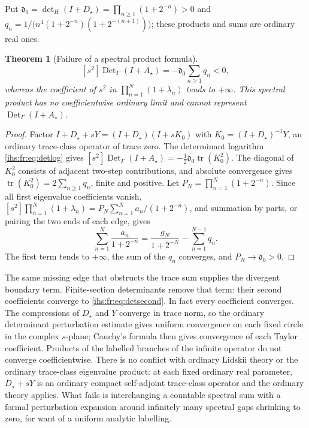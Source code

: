 \documentclass[11pt,a4paper]{article}
\numberwithin{equation}{section}
\newtheorem{theorem}{Theorem}[section]
\theoremstyle{definition}
\theoremstyle{remark}
\newcommand{\Tr}{\operatorname{tr}}
\newcommand{\Det}{\operatorname{Det}_\Gamma}
\begin{document}
Put $\mathfrak d_0=\det_H(I+D_\star)=\prod_{n\ge1}(1+2^{-n})>0$ and
$q_n=1/\bigl(n^4(1+2^{-n})(1+2^{-(n+1)})\bigr)$; these products and sums are
ordinary real ones.

\begin{theorem}[Failure of a spectral product formula]\label{ihs:fr:thm:noproduct}
\begin{equation}\label{ihs:fr:eq:detsecond}
 [s^2]\Det(I+A_\star)=-\mathfrak d_0\sum_{n\ge1}q_n<0,
\end{equation}
whereas the coefficient of $s^2$ in $\prod_{n=1}^N(1+\lambda_n)$ tends to
$+\infty$. This spectral product has no coefficientwise ordinary limit and
cannot represent $\Det(I+A_\star)$.
\end{theorem}
\begin{proof}
Factor $I+D_\star+sY=(I+D_\star)(I+sK_0)$ with $K_0=(I+D_\star)^{-1}Y$, an
ordinary trace-class operator of trace zero. The determinant logarithm
\eqref{ihs:fr:eq:detlog} gives $[s^2]\Det(I+A_\star)=-\tfrac12\mathfrak
d_0\Tr(K_0^2)$. The diagonal of $K_0^2$ consists of adjacent two-step
contributions, and absolute convergence gives
$\Tr(K_0^2)=2\sum_{n\ge1}q_n$, finite and positive. Let
$P_N=\prod_{n=1}^N(1+2^{-n})$. Since all first eigenvalue coefficients
vanish, $[s^2]\prod_{n=1}^N(1+\lambda_n)=P_N\sum_{n=1}^Na_n/(1+2^{-n})$, and
summation by parts, or pairing the two ends of each edge, gives
\begin{equation}\label{ihs:fr:eq:productboundary}
 \sum_{n=1}^N\frac{a_n}{1+2^{-n}}=\frac{g_N}{1+2^{-N}}-\sum_{n=1}^{N-1}q_n.
\end{equation}
The first term tends to $+\infty$, the sum of the $q_n$ converges, and
$P_N\to\mathfrak d_0>0$.
\end{proof}

The same missing edge that obstructs the trace sum supplies the divergent
boundary term. Finite-section determinants remove that term: their second
coefficients converge to \eqref{ihs:fr:eq:detsecond}. In fact every coefficient
converges. The compressions of $D_\star$ and $Y$ converge in trace norm, so
the ordinary determinant perturbation estimate
\cite[Equation~(4.1)]{Bornemann} gives uniform convergence on each fixed
circle in the complex $s$-plane; Cauchy's formula then gives convergence of
each Taylor coefficient. Products of the labelled branches of the infinite
operator do not converge coefficientwise. There is no conflict with ordinary
Lidskii theory or the ordinary trace-class eigenvalue product: at each fixed
ordinary real parameter, $D_\star+sY$ is an ordinary compact self-adjoint
trace-class operator and the ordinary theory applies. What fails is
interchanging a countable spectral sum with a formal perturbation expansion
around infinitely many spectral gaps shrinking to zero, for want of a
uniform analytic labelling.
\end{document}
